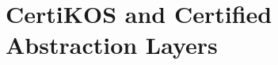 \documentclass{beamer}
\begin{document}
%
%
%
%
%


\section{CertiKOS and Certified Abstraction Layers} %
\end{document}
